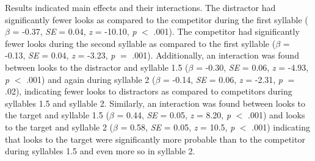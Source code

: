 Results indicated main effects and their interactions. The distractor had significantly fewer looks as compared to the competitor during the first syllable ($\beta$ = -0.37, \textit{SE} = 0.04, \textit{z} = -10.10, \textit{p} $<$ .001). The competitor had significantly fewer looks during the second syllable as compared to the first syllable  ($\beta$ = -0.13, \textit{SE} = 0.04, \textit{z} = -3.23, \textit{p} $=$ .001). Additionally, an interaction was found between looks to the distractor and syllable 1.5 ($\beta$ = -0.30, \textit{SE} = 0.06, \textit{z} = -4.93, \textit{p} $<$ .001) and again during syllable 2 ($\beta$ = -0.14, \textit{SE} = 0.06, \textit{z} = -2.31, \textit{p} $=$ .02), indicating fewer looks to distractors as compared to competitors during syllables 1.5 and syllable 2. Similarly, an interaction was found between looks to the target and syllable 1.5 ($\beta$ = 0.44, \textit{SE} = 0.05, \textit{z} = 8.20, \textit{p} $<$ .001) and looks to the target and syllable 2 ($\beta$ = 0.58, \textit{SE} = 0.05, \textit{z} = 10.5, \textit{p} $<$ .001) indicating that looks to the target were significantly more probable than to the competitor during syllables 1.5 and even more so in syllable 2.  

